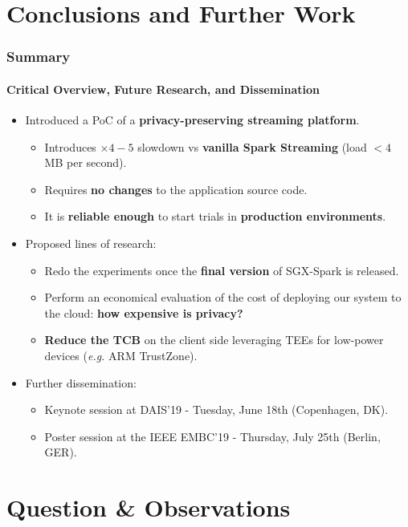 \documentclass[10pt,    %
    english,            %
    xcolor=table,       %
    envcountsect,        %
    aspectratio=169     %
]{beamer}
\begin{document}
\section{Conclusions and Further Work}
\label{sec:conclusions}
\sectionframe

\begin{frame}
    \frametitle{Summary}
    \framesubtitle{Critical Overview, Future Research, and Dissemination}

    \vspace{-20pt}

    \begin{itemize}
        \item Introduced a PoC of a \textbf{\textcolor{fgRed}{privacy-preserving streaming platform}}.
        \begin{itemize}
            \item Introduces $\times 4-5$ slowdown vs \textbf{vanilla Spark Streaming} (load $< 4$ MB per second).
            \item Requires \textbf{no changes} to the application source code.
            \item It is \textbf{reliable enough} to start trials in \textbf{\textcolor{fgRed}{production environments}}.
        \end{itemize}
        \item Proposed lines of research:
        \begin{itemize}
            \item Redo the experiments once the \textbf{final version} of SGX-Spark is released.
            \item Perform an economical evaluation of the cost of deploying our system to the cloud: \textbf{how expensive is privacy?}
            \item \textbf{Reduce the TCB} on the client side leveraging TEEs for low-power devices (\textit{e.g.} ARM TrustZone).
        \end{itemize}
        \item Further dissemination:
        \begin{itemize}
            \item Keynote session at DAIS'19 - Tuesday, June 18th (Copenhagen, DK).
            \item Poster session at the IEEE EMBC'19 - Thursday, July 25th (Berlin, GER).
        \end{itemize}
    \end{itemize}

\end{frame}

\section{Question \& Observations}
\sectionframe
\end{document}
